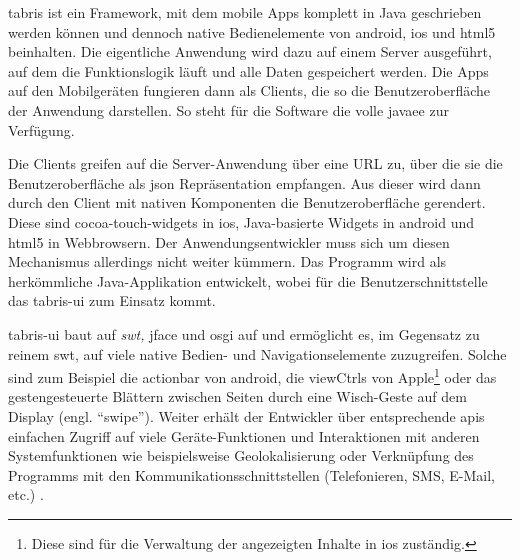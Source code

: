 \gls{tabris} ist ein Framework, mit dem mobile Apps komplett in Java geschrieben werden können und dennoch native Bedienelemente von \gls{android}, \gls{ios} und \gls{html5} beinhalten.
Die eigentliche Anwendung wird dazu auf einem Server ausgeführt, auf dem die Funktionslogik läuft und alle Daten gespeichert werden. Die Apps auf den Mobilgeräten fungieren dann als Clients, die so die Benutzeroberfläche der Anwendung darstellen.
So steht für die Software die volle \gls{javaee} zur Verfügung.

Die Clients greifen auf die Server-Anwendung über eine URL zu, über die sie die Benutzeroberfläche als \gls{json} Repräsentation empfangen. Aus dieser wird dann durch den Client mit nativen Komponenten die Benutzeroberfläche gerendert. Diese sind \gls{cocoa-touch-widgets} in \gls{ios}, Java-basierte Widgets in \gls{android} und \gls{html}5 in Webbrowsern.
Der Anwendungsentwickler muss sich um diesen Mechanismus allerdings nicht weiter kümmern. Das Programm wird als herkömmliche Java-Applikation entwickelt, wobei für die Benutzerschnittstelle das \gls{tabris-ui} zum Einsatz kommt.

\gls{tabris-ui} baut auf \textit{\gls{swt},} \gls{jface} und \gls{osgi} auf und ermöglicht es, im Gegensatz zu reinem \gls{swt}, auf viele native Bedien- und Navigationselemente zuzugreifen. Solche sind zum Beispiel die \gls{actionbar} von \gls{android}, die \glspl{viewCtrl} von Apple\footnote{Diese sind für die Verwaltung der angezeigten Inhalte in \gls{ios} zuständig.} oder das gestengesteuerte Blättern zwischen Seiten durch eine Wisch-Geste auf dem Display (engl. \enquote{swipe}). Weiter erhält der Entwickler über entsprechende \glspl{api} einfachen Zugriff auf viele Geräte-Funktionen und Interaktionen mit anderen Systemfunktionen wie beispielsweise Geolokalisierung oder Verknüpfung des Programms mit den Kommunikationsschnittstellen (Telefonieren, SMS, E-Mail, etc.) \cite{Tabris_Doc}.

